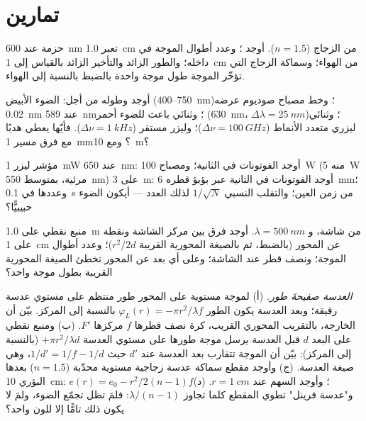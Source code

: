 \section{تمارين}

\begin{exercise}[$\star$]\label{exo:b2:scalar-light-model:1}
حزمة عند \qty{600}{nm} تعبر \qty{1.0}{cm} من الزجاج ($n = 1.5$). أوجد ؛ وعدد أطوال الموجة في داخله؛ والطور الزائد والتأخير الزائد
بالقياس إلى \qty{1}{cm} من الهواء؛ وسماكة الزجاج التي تؤخّر
الموجة طول موجة واحدة بالضبط بالنسبة إلى الهواء.
\end{exercise}

\begin{exercise}[$\star$]\label{exo:b2:scalar-light-model:2}
أوجد  وطوله من أجل: الضوء الأبيض ($400$--\qty{750}{nm})؛ وخط مصباح
صوديوم عرضه \qty{0.02}{nm} عند \qty{589}{nm}؛ وثنائي باعث للضوء أحمر (\qty{630}{nm}،
$\Delta\lambda = \qty{25}{nm}$)؛ وثنائي ليزري متعدد الأنماط ($\Delta\nu = \qty{100}{GHz}$)؛ وليزر
مستقر ($\Delta\nu = \qty{1}{kHz}$). فأيّها يعطي هدبًا مع فرق
مسير \qty{1}{mm}؟ ومع \qty{10}{m}؟
\end{exercise}

\begin{exercise}[$\star$]\label{exo:b2:scalar-light-model:3}
مؤشر ليزر \qty{1}{mW} عند \qty{650}{nm}: أوجد الفوتونات في الثانية؛ ومصباح
\qty{100}{W} (منه \qty{5}{W} مرئية، بمتوسط \qty{550}{nm}) على \qty{3}{m}: أوجد الفوتونات في
الثانية عبر بؤبؤ قطره \qty{6}{mm}؛ وعددها في \qty{0.1}{s} من زمن العين؛
والتقلب النسبي $1/\sqrt N$ لذلك العدد --- أيكون الضوء حبيبيًّا؟
\end{exercise}

\begin{exercise}[$\star$]\label{exo:b2:scalar-light-model:4}
منبع نقطي على \qty{1.0}{m} من شاشة، و $\lambda = \qty{500}{nm}$. أوجد فرق  بين مركز الشاشة ونقطة على \qty{1}{cm}
عن المحور (بالضبط، ثم بالصيغة المحورية القريبة $r^2/2d$)؛ وعدد
أطوال الموجة؛ ونصف قطر  عند الشاشة؛ وعلى أي بعد عن المحور
تخطئ الصيغة المحورية القريبة بطول موجة واحد؟
\end{exercise}

\begin{exercise}[$\star\star$]\label{exo:b2:scalar-light-model:5}
\emph{العدسة صفيحةَ طور.} (أ) لموجة مستوية على المحور
طور منتظم على مستوي عدسة رقيقة؛ وبعد العدسة يكون الطور
$\varphi_L(r) = -\pi r^2/\lambda f$ بالنسبة إلى المركز. بيّن أن 
الخارجة، بالتقريب المحوري القريب، كرة نصف قطرها $f$
مركزها $F'$. (ب) ومنبع نقطي على البعد $d$ قبل العدسة
يرسل موجة طورها على مستوي العدسة $+\pi r^2/\lambda d$ (بالنسبة إلى
المركز): بيّن أن الموجة تتقارب بعد العدسة عند $d'$ حيث
$1/d' = 1/f - 1/d$، وهي صيغة العدسة. (ج) وأوجد مقطع سماكة عدسة
زجاجية مستوية محدّبة ($n = 1.5$) بعدها البؤري \qty{10}{cm}: $e(r) =
e_0 - r^2/2(n - 1)f$؛ وأوجد السهم عند $r = \qty{1}{cm}$. (د) و"عدسة فرينل" تطوي
المقطع كلما تجاوز $\lambda/(n - 1)$: فلمَ تظل
تجمّع الضوء، ولمَ لا يكون ذلك تامًّا إلا للون واحد؟
\end{exercise}

